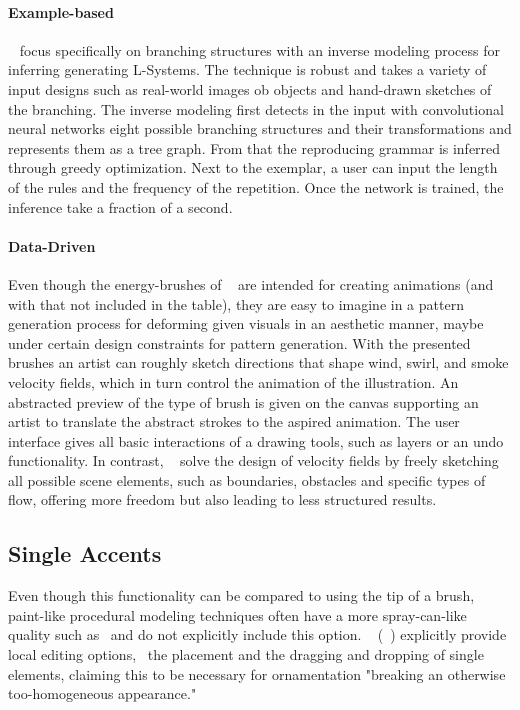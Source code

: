 \paragraph*{Example-based}
\citeauthor*{guo_2020_ipm}~\cite{guo_2020_ipm} focus specifically on branching structures with an inverse modeling process for inferring generating L-Systems. The technique is robust and takes a variety of input designs such as real-world images ob objects and hand-drawn sketches of the branching. The inverse modeling first detects in the input with convolutional neural networks eight possible branching structures and their transformations and represents them as a tree graph. From that the reproducing grammar is inferred through greedy optimization. Next to the exemplar, a user can input the length of the rules and the frequency of the repetition. Once the network is trained, the inference take a fraction of a second.

\paragraph*{Data-Driven}
Even though the energy-brushes of \citeauthor*{xing_2016_eit}~\cite{xing_2016_eit} are intended for creating animations (and with that not included in the table), they are easy to imagine in a pattern generation process for deforming given visuals in an aesthetic manner, maybe under certain design constraints for pattern generation. With the presented brushes an artist can roughly sketch directions that shape wind, swirl, and smoke velocity fields, which in turn control the animation of the illustration. An abstracted preview of the type of brush is given on the canvas supporting an artist to translate the abstract strokes to the aspired animation. The user interface gives all basic interactions of a drawing tools, such as layers or an undo functionality. In contrast, \citeauthor*{hu_2019_ssf}~\cite{hu_2019_ssf} solve the design of velocity fields by freely sketching all possible scene elements, such as boundaries, obstacles and specific types of flow, offering more freedom but also leading to less structured results. 


\subsection{Single Accents}
\label{subsubsec:analysis_single_accents}

Even though this functionality can be compared to using the tip of a brush, paint-like procedural modeling techniques often have a more spray-can-like quality such as~\cite{mech_2012_tdf} and do not explicitly include this option. \citeauthor*{gieseke_2017_ooo}~\cite{gieseke_2017_ooo} (~) explicitly provide local editing options, \eg~the placement and the dragging and dropping of single elements, claiming this to be necessary for ornamentation "breaking an otherwise too-homogeneous appearance."

